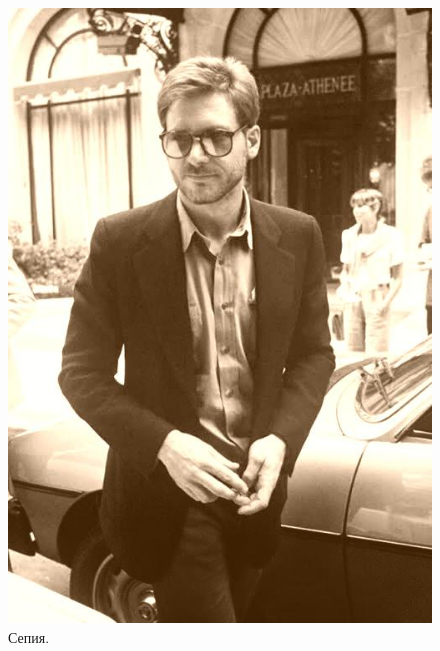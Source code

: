 \documentclass[a4paper,12pt]{article}
\begin{document}
\begin{figure}[h]
\begin{minipage}[h]{0.2\linewidth}
\includegraphics[width=1\linewidth]{Pic_Sepia}
Сепия. 
\end{minipage}
$\mspace{30mu}$
\begin{minipage}[h]{0.2\linewidth}

\end{minipage}
\end{figure}
\end{document}
